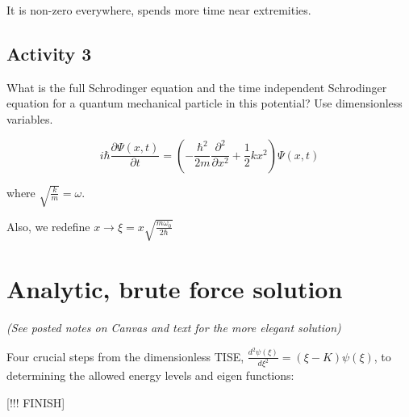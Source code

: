 \documentclass{article}
\begin{document}
It is non-zero everywhere, spends more time near extremities. 


\subsection{Activity 3}

What is the full Schrodinger equation and the time independent Schrodinger equation for a quantum mechanical particle in this potential? Use dimensionless variables. 

$$i \hbar \frac{\partial \Psi(x,t)}{\partial t} = \left( - \frac{\hbar^2}{2m} \frac{\partial^2}{\partial x^2} + \frac{1}{2} kx^2 \right) \Psi(x,t)$$

where $\sqrt{\frac{k}{m}} = \omega$. 

Also, we redefine $x \rightarrow \xi = x \sqrt{\frac{m \omega_0}{2 \hbar}}$

\section{Analytic, brute force solution}

\textit{(See posted notes on Canvas and text for the more elegant solution)}

Four crucial steps from the dimensionless TISE, $\frac{d^2 \psi(\xi)}{d \xi^2} = (\xi - K) \psi(\xi)$, to determining the allowed energy levels and eigen functions:

[!!! FINISH]
\end{document}
